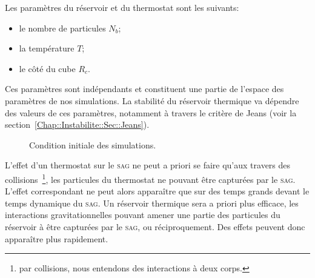 	Les paramètres du réservoir et du thermostat sont les suivants:
	\begin{itemize}
		\item le nombre de particules $N_b$;
		\item la température $T$;
		\item le côté du cube $R_c$.
	\end{itemize}
	Ces paramètres sont indépendants et constituent une partie de l'espace des paramètres de nos
	simulations. La stabilité du réservoir thermique va dépendre des valeurs de ces paramètres, notamment à
	travers le critère de Jeans (voir la section~\ref{Chap::Instabilite::Sec::Jeans}).

	\begin{figure}[hbt]
		\begin{center}
			\caption{Condition initiale des simulations.\label{Fig::CI::Repr}}
		\end{center}
	\end{figure}

	L'effet d'un thermostat sur le \textsc{sag} ne peut a priori se faire qu'aux travers des collisions~\footnote{par collisions, nous entendons
	des interactions à deux corps.}, les particules du thermostat ne pouvant être capturées par le \textsc{sag}. L'effet correspondant ne peut
	alors apparaître que sur des temps grands devant le temps dynamique du \textsc{sag}. Un réservoir thermique sera a priori plus efficace, les
	interactions gravitationnelles pouvant amener une partie des particules du réservoir à être capturées par le \textsc{sag}, ou réciproquement.
	Des effets peuvent donc apparaître plus rapidement.

